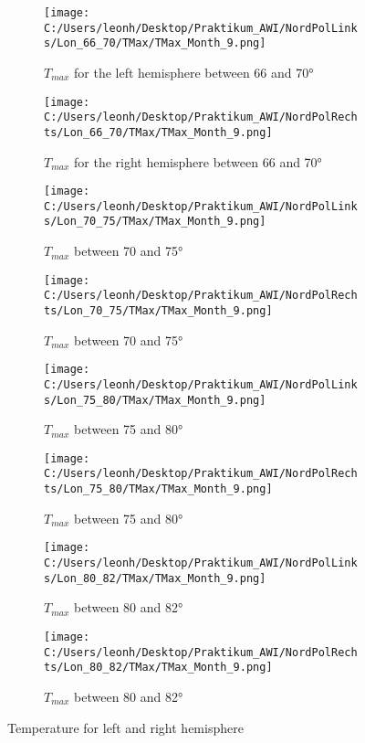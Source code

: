 \begin{figure}[ht]
    \centering
    \begin{subfigure}{0.48\textwidth}
        \centering
        \texttt{[image: C:/Users/leonh/Desktop/Praktikum\_AWI/NordPolLinks/Lon\_66\_70/TMax/TMax\_Month\_9.png]}
        \caption{$T_{max}$ for the left hemisphere between 66 and 70°}
    \end{subfigure}
    \begin{subfigure}{0.48\textwidth}
        \centering
        \texttt{[image: C:/Users/leonh/Desktop/Praktikum\_AWI/NordPolRechts/Lon\_66\_70/TMax/TMax\_Month\_9.png]}
        \caption{$T_{max}$ for the right hemisphere between 66 and 70°}
    \end{subfigure}
    
    \begin{subfigure}{0.48\textwidth}
        \centering
        \texttt{[image: C:/Users/leonh/Desktop/Praktikum\_AWI/NordPolLinks/Lon\_70\_75/TMax/TMax\_Month\_9.png]}
        \caption{$T_{max}$ between 70 and 75°}
    \end{subfigure}
    \begin{subfigure}{0.48\textwidth}
        \centering
        \texttt{[image: C:/Users/leonh/Desktop/Praktikum\_AWI/NordPolRechts/Lon\_70\_75/TMax/TMax\_Month\_9.png]}
        \caption{$T_{max}$ between 70 and 75°}
    \end{subfigure}

        
    \begin{subfigure}{0.48\textwidth}
        \centering
        \texttt{[image: C:/Users/leonh/Desktop/Praktikum\_AWI/NordPolLinks/Lon\_75\_80/TMax/TMax\_Month\_9.png]}
        \caption{$T_{max}$ between 75 and 80°}
    \end{subfigure}
    \begin{subfigure}{0.48\textwidth}
        \centering
        \texttt{[image: C:/Users/leonh/Desktop/Praktikum\_AWI/NordPolRechts/Lon\_75\_80/TMax/TMax\_Month\_9.png]}
        \caption{$T_{max}$ between 75 and 80°}
    \end{subfigure}

    \begin{subfigure}{0.48\textwidth}
        \centering
        \texttt{[image: C:/Users/leonh/Desktop/Praktikum\_AWI/NordPolLinks/Lon\_80\_82/TMax/TMax\_Month\_9.png]}
        \caption{$T_{max}$ between 80 and 82°}
    \end{subfigure}
    \begin{subfigure}{0.48\textwidth}
        \centering
        \texttt{[image: C:/Users/leonh/Desktop/Praktikum\_AWI/NordPolRechts/Lon\_80\_82/TMax/TMax\_Month\_9.png]}
        \caption{$T_{max}$ between 80 and 82°}
    \end{subfigure}
    \caption{Temperature for left and right hemisphere}
    \label{app:MaxTemp}
\end{figure}


